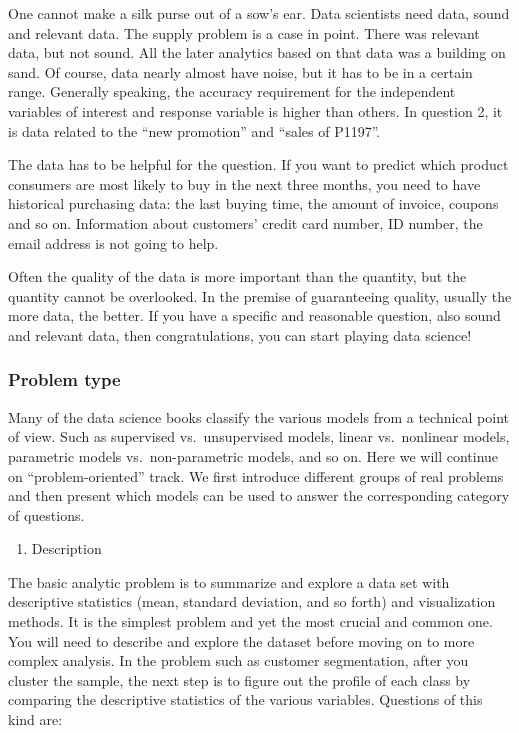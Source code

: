 \documentclass[12pt,]{krantz}
\providecommand{\tightlist}{%
  \setlength{\itemsep}{0pt}\setlength{\parskip}{0pt}}
\begin{document}
One cannot make a silk purse out of a sow's ear. Data scientists need data, sound and relevant data. The supply problem is a case in point. There was relevant data, but not sound. All the later analytics based on that data was a building on sand. Of course, data nearly almost have noise, but it has to be in a certain range. Generally speaking, the accuracy requirement for the independent variables of interest and response variable is higher than others. In question 2, it is data related to the ``new promotion'' and ``sales of P1197''.

The data has to be helpful for the question. If you want to predict which product consumers are most likely to buy in the next three months, you need to have historical purchasing data: the last buying time, the amount of invoice, coupons and so on. Information about customers' credit card number, ID number, the email address is not going to help.

Often the quality of the data is more important than the quantity, but the quantity cannot be overlooked. In the premise of guaranteeing quality, usually the more data, the better. If you have a specific and reasonable question, also sound and relevant data, then congratulations, you can start playing data science!

\hypertarget{problem-type}{%
\subsubsection{Problem type}\label{problem-type}}

Many of the data science books classify the various models from a technical point of view. Such as supervised vs.~unsupervised models, linear vs.~nonlinear models, parametric models vs.~non-parametric models, and so on. Here we will continue on ``problem-oriented'' track. We first introduce different groups of real problems and then present which models can be used to answer the corresponding category of questions.

\begin{enumerate}
\def\labelenumi{\arabic{enumi}.}
\tightlist
\item
  Description
\end{enumerate}

The basic analytic problem is to summarize and explore a data set with descriptive statistics (mean, standard deviation, and so forth) and visualization methods. It is the simplest problem and yet the most crucial and common one. You will need to describe and explore the dataset before moving on to more complex analysis. In the problem such as customer segmentation, after you cluster the sample, the next step is to figure out the profile of each class by comparing the descriptive statistics of the various variables. Questions of this kind are:
\end{document}
